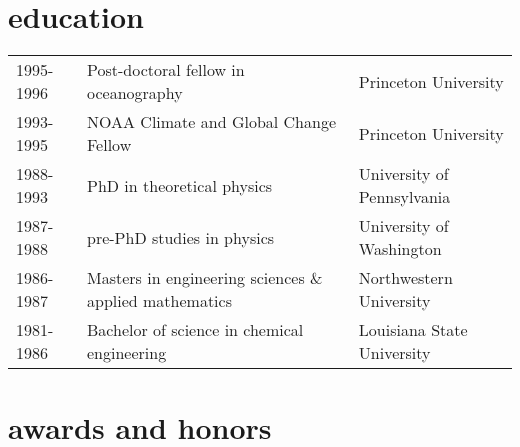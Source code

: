 \documentclass{article}
\begin{document}
\section*{\sc \color{Maroon} education}
\vspace{-.25cm}
\begin{tabular}{lll}
1995-1996  &  Post-doctoral fellow in oceanography  & Princeton University \\
1993-1995  &  NOAA Climate and Global Change Fellow  & Princeton University \\
1988-1993  &  PhD in theoretical physics  & University of Pennsylvania \\
1987-1988  &  pre-PhD studies in physics & University of Washington\\
1986-1987  &  Masters in engineering sciences \& applied mathematics   & Northwestern University\\
1981-1986  &  Bachelor of science in chemical engineering  & Louisiana State University 
\end{tabular}


\section*{\sc  \color{Maroon}   awards and honors}
\vspace{-.25cm}
\end{document}
